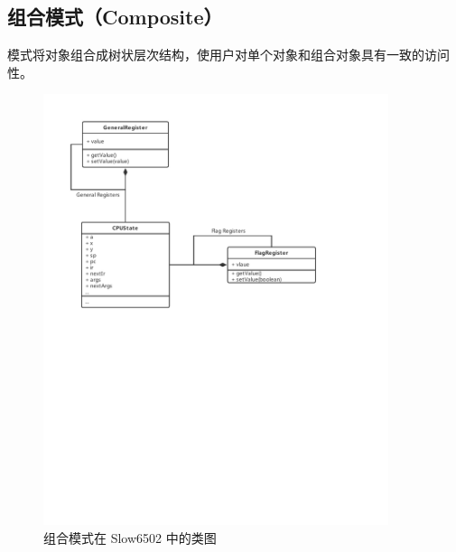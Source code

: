\subsection{组合模式（Composite）}

模式将对象组合成树状层次结构，使用户对单个对象和组合对象具有一致的访问性。

\begin{figure}[htb]
    \centering
    \includegraphics[width=0.9\textwidth]{figures/Composite.pdf}
    \caption{组合模式在 Slow6502 中的类图}
\end{figure}

